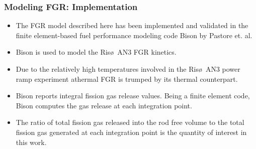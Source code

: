 \begin{frame}
\frametitle{Modeling FGR: Implementation}

\begin{itemize}  
  \item The FGR model described here has been implemented and validated in the finite element-based fuel performance modeling code Bison by Pastore et. al.
  \item Bison is used to model the Ris\o~AN3 FGR kinetics.
  \item Due to the relatively high temperatures involved in the Ris\o~AN3 power ramp experiment athermal FGR is trumped by its thermal counterpart. 
  \item Bison reports integral fission gas release values. Being a finite element code, Bison computes the gas release at each integration point. 
  \item The ratio of total fission gas released into the rod free volume to the total fission gas generated at each integration point is the quantity of interest in this work.
\end{itemize}

\end{frame}




